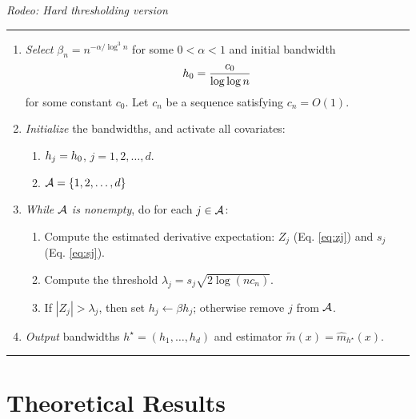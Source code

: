 \begin{table}[ht]
    {\it Rodeo: Hard thresholding version}
    \vskip5pt
    \hrule
    \vskip5pt
    \begin{enumerate}
        \item {\it Select\/} $\beta_n = n^{-\alpha/\log^3 n}$ for some $0 < \alpha < 1$ and initial bandwidth
        \begin{equation}
            \label{eq:initial_h}
            h_{0} = \frac{c_0}{\log \log n}
        \end{equation}
        for some constant $c_0$.  
        Let $c_n$ be a sequence satisfying $c_n = O(1)$. 
        \item {\it Initialize\/} the bandwidths, and activate all covariates:
        \begin{enumerate}
            \item $h_j = h_{0}$, $j=1,2,\ldots, d$.
            \item ${\mathcal A} = \{1,2,\ldots, d\}$
        \end{enumerate}
        \item {\it While ${\mathcal A}$ is nonempty}, do for each $j\in {\mathcal A}$:
        \begin{enumerate}
            \item Compute the estimated derivative expectation: $Z_j$ (Eq. \ref{eq:zj})
            and $s_j$ (Eq. \ref{eq:sj}). 
            \item Compute the threshold
            $ \lambda_j = \displaystyle s_j \sqrt{2 \log (n c_n)}$.
            \item If $|Z_j| > \lambda_j$, then set $h_j \leftarrow \beta h_j$;
            otherwise remove $j$ from ${\mathcal A}$.
        \end{enumerate}
        \item {\it Output} bandwidths $h^\star=(h_1,\ldots,h_d)$ and estimator
        $\tilde{m}(x) = \hat{m}_{h^\star}(x)$.
    \end{enumerate}
    \vskip10pt
    \hrule
    \vskip10pt
    \caption{The hard thresholding version of the rodeo, which can be applied
    using the derivatives $Z_j$ of any nonparametric smoother.}
    \label{fig::hard-rodeo}
    \vskip15pt
\end{table}

\section{Theoretical Results}
\label{sec:theorem}

